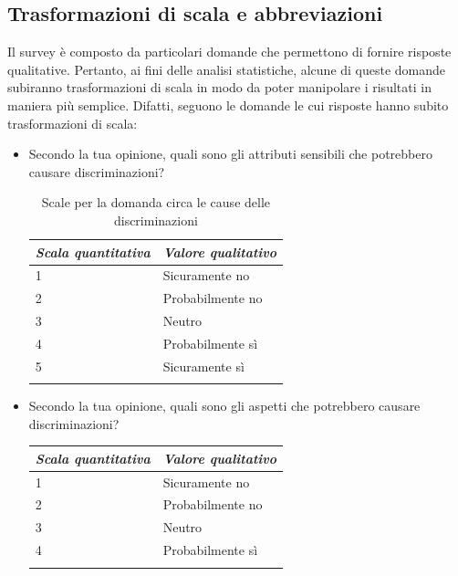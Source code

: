 \subsection{Trasformazioni di scala e abbreviazioni}
Il survey è composto da particolari domande che permettono di fornire risposte qualitative. Pertanto, ai fini delle analisi statistiche, alcune di queste domande subiranno trasformazioni di scala in modo da poter manipolare i risultati in maniera più semplice. Difatti, seguono le domande le cui risposte hanno subito trasformazioni di scala:
\begin{itemize}
    \item Secondo la tua opinione, quali sono gli attributi sensibili che potrebbero causare discriminazioni?\\
    \begin{longtable}{| p{} | p{} |}
      \hline\textbf{\textit{Scala quantitativa}} & \textbf{\textit{Valore qualitativo}}
        \\ \hline
        \rowcolor{Gray!30}
        1 & Sicuramente no
        \\ \hline
        2 & Probabilmente no
        \\ \hline
        \rowcolor{Gray!30}
        3 & Neutro
         \\ \hline
        4 & Probabilmente sì
        \\ \hline
        \rowcolor{Gray!30}
        5 & Sicuramente sì
        \\ \hline
        \caption{Scale per la domanda circa le cause delle discriminazioni} %
        \label{tab:myfirstlongtable}
    \end{longtable}
    \item Secondo la tua opinione, quali sono gli aspetti che potrebbero causare discriminazioni?\\
    \begin{longtable}{| p{} | p{} |}
      \hline\textbf{\textit{Scala quantitativa}} & \textbf{\textit{Valore qualitativo}}
        \\ \hline
        \rowcolor{Gray!30}
        1 & Sicuramente no
        \\ \hline
        2 & Probabilmente no
        \\ \hline
        \rowcolor{Gray!30}
        3 & Neutro
         \\ \hline
        4 & Probabilmente sì
        \\ \hline
        \rowcolor{Gray!30}

\end{longtable}
\end{itemize}
